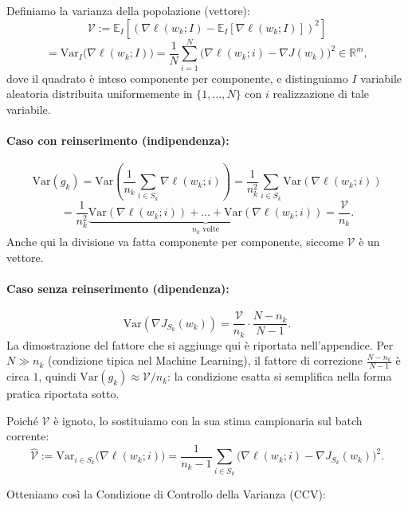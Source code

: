 \documentclass[a4paper,12pt]{article}
\numberwithin{equation}{section}
\numberwithin{figure}{section}
\numberwithin{table}{section}
\newcommand{\Var}{\mathrm{Var}}
\begin{document}
Definiamo la varianza della popolazione (vettore):
\[
\mathcal{V}
:= \mathbb{E}_{I}\left[ \left( \nabla \ell(w_k; I) - \mathbb{E}_{I}[\nabla \ell(w_k; I)] \right)^{2} \right] \]\[
= \Var_{I}\bigl(\nabla \ell(w_k; I)\bigr) 
= \frac{1}{N}\sum_{i=1}^{N}\bigl(\nabla \ell(w_k; i) - \nabla J(w_k)\bigr)^2 \in \mathbb{R}^m,
\]
dove il quadrato è inteso componente per componente, e distinguiamo $I$ variabile aleatoria distribuita uniformemente in $\{1,\dots,N\}$ con $i$ realizzazione di tale variabile.

\paragraph{Caso con reinserimento (indipendenza):}
\[
  \Var(g_k) = \Var\!\left(\frac{1}{n_k}\sum_{i\in S_k}\nabla\ell(w_k;i)\right)
  = \frac{1}{n_k^2}\sum_{i\in S_k}\Var(\nabla\ell(w_k;i))
  \]\[
  = \frac{1}{n_k^2}\underbrace{\Var(\nabla\ell(w_k;i))+\dots+\Var(\nabla\ell(w_k;i))}_{n_k \text{ volte}}
  = \frac{\mathcal{V}}{n_k}.
\]
Anche qui la divisione va fatta componente per componente, siccome $\mathcal{V}$ è un vettore.

\paragraph{Caso senza reinserimento (dipendenza):}
\[
  \Var\!\left(\nabla J_{S_k}(w_k)\right) = \frac{\mathcal{V}}{n_k}\cdot\frac{N-n_k}{N-1}.
\]
La dimostrazione del fattore che si aggiunge qui è riportata nell'appendice.
Per $N \gg n_k$ (condizione tipica nel Machine Learning), il fattore di correzione $\frac{N-n_k}{N-1}$ è circa $1$, quindi $\Var(g_k) \approx \mathcal{V}/n_k$: la condizione esatta si semplifica nella forma pratica riportata sotto.

Poich\'e $\mathcal{V}$ \`e ignoto, lo sostituiamo con la sua stima campionaria sul batch corrente:
\[
  \widehat{\mathcal{V}} := \Var_{i \in S_k}\bigl(\nabla \ell(w_k;i)\bigr)
  = \frac{1}{n_k-1}\sum_{i\in S_k}\bigl(\nabla \ell(w_k;i) - \nabla J_{S_k}(w_k)\bigr)^2.
\]

Otteniamo cos\`i la Condizione di Controllo della Varianza (CCV):
\end{document}
